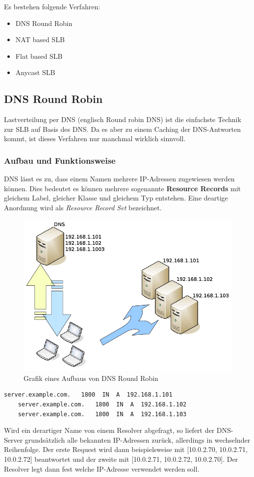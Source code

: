 Es bestehen folgende Verfahren:
\begin{itemize}
	\item DNS Round Robin
	\item NAT based SLB
	\item Flat based SLB
	\item Anycast SLB
\end{itemize}

\newpage
\subsection{DNS Round Robin}\cite{LastverteilungPerDNS}


Lastverteilung per DNS (englisch Round robin DNS) ist die einfachste Technik zur SLB auf Basis des DNS. Da es aber zu einem Caching der DNS-Antworten kommt, ist dieses Verfahren nur manchmal wirklich sinnvoll.

\subsubsection{Aufbau und Funktionsweise}\cite{RoundRobinDNS}
DNS lässt es zu, dass einem Namen mehrere IP-Adressen zugewiesen werden können. Dies bedeutet es können mehrere sogenannte \textbf{Resource Records} mit gleichem Label, gleicher Klasse und gleichem Typ entstehen. Eine deartige Anordnung wird als \textit{Resource Record Set} bezeichnet.

\begin{figure}[!h]
	\begin{center}
		\includegraphics[width=0.5\linewidth]{images/RR-DNS}
		\caption{Grafik eines Aufbaus von DNS Round Robin}
		\label{broker}
	\end{center}
\end{figure}
\begin{center}

\begin{lstlisting}[caption=DNS Round Robin Example]
    server.example.com.   1800  IN  A  192.168.1.101
    server.example.com.   1800  IN  A  192.168.1.102
    server.example.com.   1800  IN  A  192.168.1.103
\end{lstlisting}
\end{center}
Wird ein derartiger Name von einem Resolver abgefragt, so liefert der DNS-Server grundsätzlich alle bekannten IP-Adressen zurück, allerdings in wechselnder Reihenfolge. Der erste Request wird dann beispielsweise mit [10.0.2.70, 10.0.2.71, 10.0.2.72] beantwortet und der zweite mit [10.0.2.71, 10.0.2.72, 10.0.2.70]. Der Resolver legt dann fest welche IP-Adresse verwendet werden soll.


